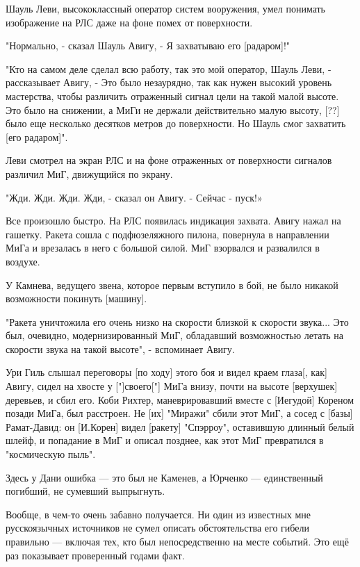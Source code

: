 \begin{textcitation}
	Шауль Леви, высококлассный оператор систем вооружения, умел понимать изображение на РЛС даже на фоне помех от поверхности.
	
	"Нормально, - сказал Шауль Авигу, - Я захватываю его [радаром]!"
	
	"Кто на самом деле сделал всю работу, так это мой оператор, Шауль Леви, - рассказывает Авигу, - Это было незаурядно, так как нужен высокий уровень мастерства, чтобы различить отраженный сигнал цели на такой малой высоте. Это было на снижении, а МиГи не держали действительно малую высоту, [??] было еще несколько десятков метров до поверхности. Но Шауль смог захватить [его радаром]".
	
	Леви смотрел на экран РЛС и на фоне отраженных от поверхности сигналов различил МиГ, движущийся по экрану.
	
	"Жди. Жди. Жди. Жди, - сказал он Авигу. - Сейчас - пуск!»
	
	Все произошло быстро. На РЛС появилась индикация захвата. Авигу нажал на гашетку. Ракета сошла с подфюзеляжного пилона, повернула в направлении МиГа и врезалась в него с большой силой. МиГ взорвался и развалился в воздухе.
	
	У Камнева, ведущего звена, которое первым вступило в бой, не было никакой возможности покинуть [машину].
	
	"Ракета уничтожила его очень низко на скорости близкой к скорости звука... Это был, очевидно, модернизированный МиГ, обладавший возможностью летать на скорости звука на такой высоте", - вспоминает Авигу.
	
	Ури Гиль слышал переговоры [по ходу] этого боя и видел краем глаза[, как] Авигу, сидел на хвосте у ["]своего["] МиГа внизу, почти на высоте [верхушек] деревьев, и сбил его. Коби Рихтер, маневрировавший вместе с [Иегудой] Кореном позади МиГа, был расстроен. Не [их] "Миражи" сбили этот МиГ, а сосед с [базы] Рамат-Давид: он [И.Корен] видел [ракету] "Спэрроу", оставившую длинный белый шлейф, и попадание в МиГ и описал позднее, как этот МиГ превратился в "космическую пыль".
\end{textcitation}

Здесь у Дани ошибка — это был не Каменев, а Юрченко — единственный погибший, не сумевший выпрыгнуть.

Вообще, в чем-то очень забавно получается. Ни один из известных мне русскоязычных источников не сумел описать обстоятельства его гибели правильно — включая тех, кто был непосредственно на месте событий. Это ещё раз показывает проверенный годами факт.

